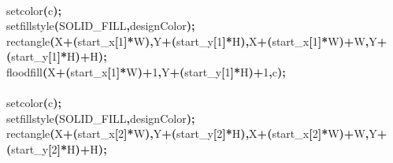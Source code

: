 \documentclass[a4paper, 10pt]{article}
\newcommand\SPC{\hspace*{0.6em}}
\newcommand{\CppAIdentifier}[1]{#1}
\newcommand{\CppANumber}[1]{\textcolor[rgb]{0.5,0,0.5}{#1}}
\newcommand{\CppASpace}[1]{\colorbox[rgb]{1,1,1}{#1}}
\newcommand{\CppASymbol}[1]{\textbf{\textcolor[rgb]{1,0,0}{#1}}}
\begin{document}
\begin{ttfamily}
\\
\CppASpace{\SPC }\CppAIdentifier{setcolor}\CppASymbol{(}\CppAIdentifier{c}\CppASymbol{)}\CppASymbol{;}\\
\CppASpace{\SPC }\CppAIdentifier{setfillstyle}\CppASymbol{(}\CppAIdentifier{SOLID\_FILL}\CppASymbol{,}\CppAIdentifier{designColor}\CppASymbol{)}\CppASymbol{;}\\
\CppASpace{\SPC }\CppAIdentifier{rectangle}\CppASymbol{(}\CppAIdentifier{X}\CppASymbol{+}\CppASymbol{(}\CppAIdentifier{start\_x}\CppASymbol{[}\CppANumber{1}\CppASymbol{]}\CppASymbol{*}\CppAIdentifier{W}\CppASymbol{)}\CppASymbol{,}\CppAIdentifier{Y}\CppASymbol{+}\CppASymbol{(}\CppAIdentifier{start\_y}\CppASymbol{[}\CppANumber{1}\CppASymbol{]}\CppASymbol{*}\CppAIdentifier{H}\CppASymbol{)}\CppASymbol{,}\CppAIdentifier{X}\CppASymbol{+}\CppASymbol{(}\CppAIdentifier{start\_x}\CppASymbol{[}\CppANumber{1}\CppASymbol{]}\CppASymbol{*}\CppAIdentifier{W}\CppASymbol{)}\CppASymbol{+}\CppAIdentifier{W}\CppASymbol{,}\CppAIdentifier{Y}\CppASymbol{+}\CppASymbol{(}\CppAIdentifier{start\_y}\CppASymbol{[}\CppANumber{1}\CppASymbol{]}\CppASymbol{*}\CppAIdentifier{H}\CppASymbol{)}\CppASymbol{+}\CppAIdentifier{H}\CppASymbol{)}\CppASymbol{;}\\
\CppASpace{\SPC }\CppAIdentifier{floodfill}\CppASymbol{(}\CppAIdentifier{X}\CppASymbol{+}\CppASymbol{(}\CppAIdentifier{start\_x}\CppASymbol{[}\CppANumber{1}\CppASymbol{]}\CppASymbol{*}\CppAIdentifier{W}\CppASymbol{)}\CppASymbol{+}\CppANumber{1}\CppASymbol{,}\CppAIdentifier{Y}\CppASymbol{+}\CppASymbol{(}\CppAIdentifier{start\_y}\CppASymbol{[}\CppANumber{1}\CppASymbol{]}\CppASymbol{*}\CppAIdentifier{H}\CppASymbol{)}\CppASymbol{+}\CppANumber{1}\CppASymbol{,}\CppAIdentifier{c}\CppASymbol{)}\CppASymbol{;}\\
\\
\CppASpace{\SPC }\CppAIdentifier{setcolor}\CppASymbol{(}\CppAIdentifier{c}\CppASymbol{)}\CppASymbol{;}\\
\CppASpace{\SPC }\CppAIdentifier{setfillstyle}\CppASymbol{(}\CppAIdentifier{SOLID\_FILL}\CppASymbol{,}\CppAIdentifier{designColor}\CppASymbol{)}\CppASymbol{;}\\
\CppASpace{\SPC }\CppAIdentifier{rectangle}\CppASymbol{(}\CppAIdentifier{X}\CppASymbol{+}\CppASymbol{(}\CppAIdentifier{start\_x}\CppASymbol{[}\CppANumber{2}\CppASymbol{]}\CppASymbol{*}\CppAIdentifier{W}\CppASymbol{)}\CppASymbol{,}\CppAIdentifier{Y}\CppASymbol{+}\CppASymbol{(}\CppAIdentifier{start\_y}\CppASymbol{[}\CppANumber{2}\CppASymbol{]}\CppASymbol{*}\CppAIdentifier{H}\CppASymbol{)}\CppASymbol{,}\CppAIdentifier{X}\CppASymbol{+}\CppASymbol{(}\CppAIdentifier{start\_x}\CppASymbol{[}\CppANumber{2}\CppASymbol{]}\CppASymbol{*}\CppAIdentifier{W}\CppASymbol{)}\CppASymbol{+}\CppAIdentifier{W}\CppASymbol{,}\CppAIdentifier{Y}\CppASymbol{+}\CppASymbol{(}\CppAIdentifier{start\_y}\CppASymbol{[}\CppANumber{2}\CppASymbol{]}\CppASymbol{*}\CppAIdentifier{H}\CppASymbol{)}\CppASymbol{+}\CppAIdentifier{H}\CppASymbol{)}\CppASymbol{;}\\

\end{ttfamily}
\end{document}

